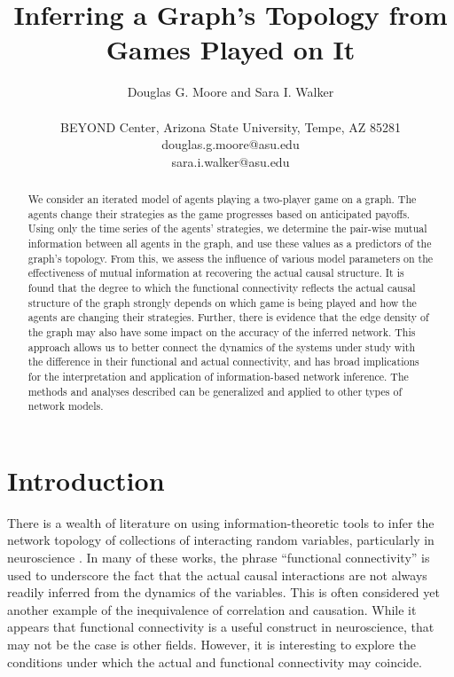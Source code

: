 \documentclass[letterpaper]{article}
\title{Inferring a Graph's Topology from Games Played on It}
\author{Douglas G. Moore and Sara I. Walker\\ \mbox{} \\
BEYOND Center, Arizona State University, Tempe, AZ 85281\\
douglas.g.moore@asu.edu\\
sara.i.walker@asu.edu}
\begin{document}
\maketitle

\begin{abstract}
We consider an iterated model of agents playing a two-player game on a graph. The agents change their strategies as the game progresses based on anticipated payoffs. Using only the time series of the agents' strategies, we determine the pair-wise mutual information between all agents in the graph, and use these values as a predictors of the graph's topology. From this, we assess the influence of various model parameters on the effectiveness of mutual information at recovering the actual causal structure. It is found that the degree to which the functional connectivity reflects the actual causal structure of the graph strongly depends on which game is being played and how the agents are changing their strategies. Further, there is evidence that the edge density of the graph may also have some impact on the accuracy of the inferred network. This approach allows us to better connect the dynamics of the systems under study with the difference in their functional and actual connectivity, and has broad implications for the interpretation and application of information-based network inference. The methods and analyses described can be generalized and applied to other types of network models.
\end{abstract}

\section{Introduction}\label{sec:intro}

There is a wealth of literature on using information-theoretic tools to infer the network topology of collections of interacting random variables, particularly in neuroscience \citep{Ito2011-yi, Vicente2011-mj,Lizier2012-nf,Ver_Steeg2012-sl,Banerji2013-wd,Sun2014-ib,Sun2015-xs}. In many of these works, the phrase ``functional connectivity'' is used to underscore the fact that the actual causal interactions are not always readily inferred from the dynamics of the variables. This is often considered yet another example of the inequivalence of correlation and causation. While it appears that functional connectivity is a useful construct in neuroscience, that may not be the case is other fields. However, it is interesting to explore the conditions under which the actual and functional connectivity may coincide.
\end{document}
